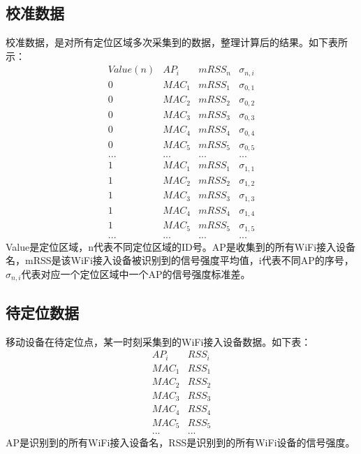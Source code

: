 \documentclass[a4paper, UTF8]{ctexart}
\begin{document}
\subsection{校准数据}
校准数据，是对所有定位区域多次采集到的数据，整理计算后的结果。如下表所示：
\begin{equation}
  \begin{array}{c|c|c|c}
    Value(n) & AP_{i} & mRSS_{n} & \sigma_{n,i} \\
    \hline
    0 & MAC_{1} & mRSS_{1} & \sigma_{0,1} \\
    0 & MAC_{2} & mRSS_{2} & \sigma_{0,2} \\
    0 & MAC_{3} & mRSS_{3} & \sigma_{0,3} \\
    0 & MAC_{4} & mRSS_{4} & \sigma_{0,4} \\
    0 & MAC_{5} & mRSS_{5} & \sigma_{0,5} \\
    ... & ... & ... & ...\\
    1 & MAC_{1} & mRSS_{1} & \sigma_{1,1} \\
    1 & MAC_{2} & mRSS_{2} & \sigma_{1,2} \\
    1 & MAC_{3} & mRSS_{3} & \sigma_{1,3} \\
    1 & MAC_{4} & mRSS_{4} & \sigma_{1,4} \\
    1 & MAC_{5} & mRSS_{5} & \sigma_{1,5} \\
    ... & ... & ... & ...
  \end{array}
\end{equation}
Value是定位区域，n代表不同定位区域的ID号。AP是收集到的所有WiFi接入设备名，mRSS是该WiFi接入设备被识别到的信号强度平均值，i代表不同AP的序号，$\sigma_{n,i}$代表对应一个定位区域中一个AP的信号强度标准差。
\subsection{待定位数据}
移动设备在待定位点，某一时刻采集到的WiFi接入设备数据。如下表：
\begin{equation}
  \begin{array}{c|c}
    AP_{i} & RSS_{i}\\
    \hline
    MAC_{1} & RSS_{1}\\
    MAC_{2} & RSS_{2}\\
    MAC_{3} & RSS_{3}\\
    MAC_{4} & RSS_{4}\\
    MAC_{5} & RSS_{5}\\
    ... & ...
  \end{array}
\end{equation}
AP是识别到的所有WiFi接入设备名，RSS是识别到的所有WiFi设备的信号强度。
\end{document}
